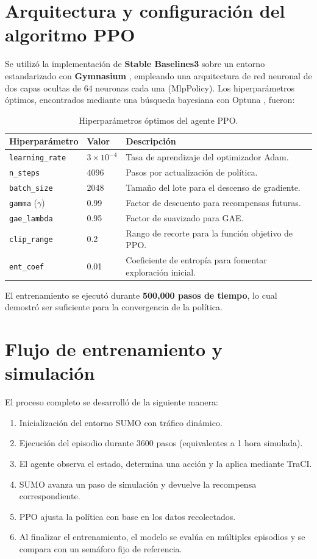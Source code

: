 \documentclass[12pt, a4paper]{report}
\begin{document}
\section{Arquitectura y configuración del algoritmo PPO}
Se utilizó la implementación de \textbf{Stable Baselines3} \cite{31} sobre un entorno estandarizado con \textbf{Gymnasium} \cite{32}, empleando una arquitectura de red neuronal de dos capas ocultas de 64 neuronas cada una (MlpPolicy). Los hiperparámetros óptimos, encontrados mediante una búsqueda bayesiana con Optuna \cite{51}, fueron:

\begin{table}[H]
    \centering
    \begin{tabular}{@{}lll@{}}
        \toprule
        \textbf{Hiperparámetro} & \textbf{Valor} & \textbf{Descripción} \\ \midrule
        \texttt{learning\_rate} & $3 \times 10^{-4}$ & Tasa de aprendizaje del optimizador Adam. \\
        \texttt{n\_steps} & 4096 & Pasos por actualización de política. \\
        \texttt{batch\_size} & 2048 & Tamaño del lote para el descenso de gradiente. \\
        \texttt{gamma} ($\gamma$) & 0.99 & Factor de descuento para recompensas futuras. \\
        \texttt{gae\_lambda} & 0.95 & Factor de suavizado para GAE. \\
        \texttt{clip\_range} & 0.2 & Rango de recorte para la función objetivo de PPO. \\
        \texttt{ent\_coef} & 0.01 & Coeficiente de entropía para fomentar exploración inicial. \\ \bottomrule
    \end{tabular}
    \caption{Hiperparámetros óptimos del agente PPO.}
    \label{tab:hyperparameters}
\end{table}

El entrenamiento se ejecutó durante \textbf{500,000 pasos de tiempo}, lo cual demostró ser suficiente para la convergencia de la política.

\section{Flujo de entrenamiento y simulación}
El proceso completo se desarrolló de la siguiente manera:
\begin{enumerate}
    \item Inicialización del entorno SUMO con tráfico dinámico.
    \item Ejecución del episodio durante 3600 pasos (equivalentes a 1 hora simulada).
    \item El agente observa el estado, determina una acción y la aplica mediante TraCI.
    \item SUMO avanza un paso de simulación y devuelve la recompensa correspondiente.
    \item PPO ajusta la política con base en los datos recolectados.
    \item Al finalizar el entrenamiento, el modelo se evalúa en múltiples episodios y se compara con un semáforo fijo de referencia.
\end{enumerate}
\end{document}
